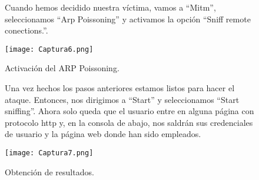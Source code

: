 \documentclass[12pt,letterpaper]{article}
\begin{document}
\begin{enumerate}
\begin{figure}
	\item Cuando hemos decidido nuestra víctima, vamos a ``Mitm'', seleccionamos ``Arp Poissoning'' y activamos la opción ``Sniff remote conections.''.
	\begin{center}
		\texttt{[image: Captura6.png]}
		\caption{Activación del ARP Poissoning.}
		\label{fig: Activación del ARP Poissoning}
	\end{center}
\end{figure}

\begin{figure}
	\item Una vez hechos los pasos anteriores estamos listos para hacer el ataque. Entonces, nos dirigimos a ``Start'' y seleccionamos ``Start sniffing''. Ahora solo queda que el usuario entre en alguna página con protocolo http y, en la consola de abajo, nos saldrán sus credenciales de usuario y la página web donde han sido empleados.
	\begin{center}
		\texttt{[image: Captura7.png]}
		\caption{Obtención de resultados.}
		\label{fig: Obtención de resultados}
	\end{center}
\end{figure}
\end{enumerate}
\end{document}
